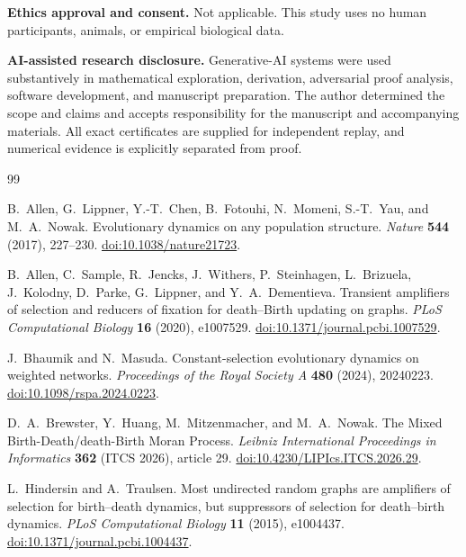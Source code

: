 \documentclass[11pt]{article}
\theoremstyle{definition}
\theoremstyle{remark}
\begin{document}
\medskip
\noindent\textbf{Ethics approval and consent.}
Not applicable.  This study uses no human participants, animals, or empirical
biological data.

\medskip
\noindent\textbf{AI-assisted research disclosure.}
Generative-AI systems were used substantively in mathematical exploration,
derivation, adversarial proof analysis, software development, and manuscript
preparation.  The author determined the scope and claims and accepts
responsibility for the manuscript and accompanying materials.  All exact
certificates are supplied for independent replay, and numerical evidence is
explicitly separated from proof.

\scriptsize\raggedright
\begin{thebibliography}{99}
\setlength{\itemsep}{0pt}

B.~Allen, G.~Lippner, Y.-T.~Chen, B.~Fotouhi, N.~Momeni,
S.-T.~Yau, and M.~A.~Nowak.
Evolutionary dynamics on any population structure.
\emph{Nature} \textbf{544} (2017), 227--230.
\href{https://doi.org/10.1038/nature21723}{doi:10.1038/nature21723}.

B.~Allen, C.~Sample, R.~Jencks, J.~Withers, P.~Steinhagen,
L.~Brizuela, J.~Kolodny, D.~Parke, G.~Lippner, and Y.~A.~Dementieva.
Transient amplifiers of selection and reducers of fixation for death--Birth
updating on graphs.
\emph{PLoS Computational Biology} \textbf{16} (2020), e1007529.
\href{https://doi.org/10.1371/journal.pcbi.1007529}
{doi:10.1371/journal.pcbi.1007529}.

J.~Bhaumik and N.~Masuda.
Constant-selection evolutionary dynamics on weighted networks.
\emph{Proceedings of the Royal Society A} \textbf{480} (2024), 20240223.
\href{https://doi.org/10.1098/rspa.2024.0223}
{doi:10.1098/rspa.2024.0223}.

D.~A.~Brewster, Y.~Huang, M.~Mitzenmacher, and M.~A.~Nowak.
The Mixed Birth-Death/death-Birth Moran Process.
\emph{Leibniz International Proceedings in Informatics} \textbf{362}
(ITCS 2026), article 29.
\href{https://doi.org/10.4230/LIPIcs.ITCS.2026.29}
{doi:10.4230/LIPIcs.ITCS.2026.29}.

L.~Hindersin and A.~Traulsen.
Most undirected random graphs are amplifiers of selection for birth--death
dynamics, but suppressors of selection for death--birth dynamics.
\emph{PLoS Computational Biology} \textbf{11} (2015), e1004437.
\href{https://doi.org/10.1371/journal.pcbi.1004437}
{doi:10.1371/journal.pcbi.1004437}.


\end{thebibliography}
\end{document}
